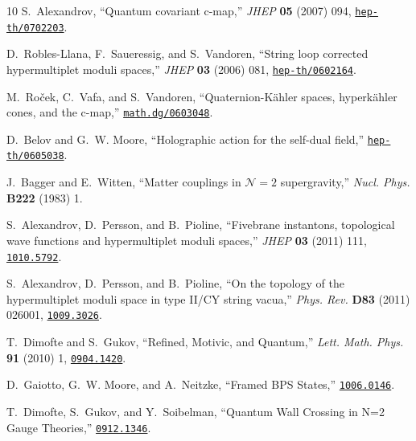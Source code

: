 \documentclass[12pt,reqno]{article}
\numberwithin{equation}{section}
\numberwithin{equation}{section}
\begin{document}
\begin{thebibliography}{10}
S.~Alexandrov, ``{Quantum covariant c-map},'' {\em JHEP} {\bf 05} (2007) 094,
\href{http://www.arXiv.org/abs/hep-th/0702203}{{\tt hep-th/0702203}}.

D.~Robles-Llana, F.~Saueressig, and S.~Vandoren, ``String loop corrected
  hypermultiplet moduli spaces,'' {\em JHEP} {\bf 03} (2006) 081,
\href{http://www.arXiv.org/abs/hep-th/0602164}{{\tt hep-th/0602164}}.

M.~Ro\v{c}ek, C.~Vafa, and S.~Vandoren, ``{Q}uaternion-{K\"a}hler spaces,
  hyperk{\"a}hler cones, and the c-map,''
\href{http://www.arXiv.org/abs/math.dg/0603048}{{\tt math.dg/0603048}}.

D.~Belov and G.~W. Moore, ``{Holographic action for the self-dual field},''
\href{http://www.arXiv.org/abs/hep-th/0605038}{{\tt hep-th/0605038}}.

J.~Bagger and E.~Witten, ``{M}atter couplings in {${\mathcal N}=2$}
  supergravity,'' {\em Nucl. Phys.} {\bf B222} (1983)
1.

S.~Alexandrov, D.~Persson, and B.~Pioline, ``{Fivebrane instantons, topological
  wave functions and hypermultiplet moduli spaces},'' {\em JHEP} {\bf 03}
  (2011) 111,
\href{http://www.arXiv.org/abs/1010.5792}{{\tt 1010.5792}}.

S.~Alexandrov, D.~Persson, and B.~Pioline, ``{On the topology of the
  hypermultiplet moduli space in type II/CY string vacua},'' {\em Phys. Rev.}
  {\bf D83} (2011) 026001,
\href{http://www.arXiv.org/abs/1009.3026}{{\tt 1009.3026}}.

T.~Dimofte and S.~Gukov, ``{Refined, Motivic, and Quantum},'' {\em Lett. Math.
  Phys.} {\bf 91} (2010) 1,
\href{http://www.arXiv.org/abs/0904.1420}{{\tt 0904.1420}}.

D.~Gaiotto, G.~W. Moore, and A.~Neitzke, ``{Framed BPS States},''
\href{http://www.arXiv.org/abs/1006.0146}{{\tt 1006.0146}}.

T.~Dimofte, S.~Gukov, and Y.~Soibelman, ``{Quantum Wall Crossing in N=2 Gauge
  Theories},''
\href{http://www.arXiv.org/abs/0912.1346}{{\tt 0912.1346}}.


\end{thebibliography}
\end{document}
